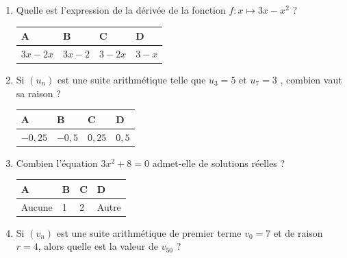 \documentclass[oneside,12pt]{exam}          %
\begin{document}
\begin{enumerate}[label=\underline{Question \no\arabic*} :  , leftmargin=* , itemsep=4mm]
	\item Quelle est l'expression de la dérivée de la fonction $f : x \mapsto 3x - x^2$ \; ?
	
		\hspace{\linewidth-\textwidth}
		\renewcommand{\arraystretch}{1.5}
		\begin{tabular}{| P{0.22\textwidth} | P{0.22\textwidth} | P{0.22\textwidth} | P{0.22\textwidth} |} \hline
			A & B & C & D \\ \hline
			$3x - 2x$ & $3x - 2$ & $3 - 2x$ & $3 - x$ \\ \hline
		\end{tabular}



	\item Si $(u_n)$ est une suite arithmétique telle que $u_3 = 5$ et $u_7 = 3$ , combien vaut sa raison ?
	
		\hspace{\linewidth-\textwidth}
		\renewcommand{\arraystretch}{1.5}
		\begin{tabular}{| P{0.22\textwidth} | P{0.22\textwidth} | P{0.22\textwidth} | P{0.22\textwidth} |} \hline
			A & B & C & D \\ \hline
			$-0,25$ & $-0,5$ & $0,25$ & $0,5$ \\ \hline
		\end{tabular}
		
		

	\item Combien l'équation $3x^2 + 8 = 0$ admet-elle de solutions réelles ?
	
		\hspace{\linewidth-\textwidth}
		\renewcommand{\arraystretch}{1.5}
		\begin{tabular}{| P{0.22\textwidth} | P{0.22\textwidth} | P{0.22\textwidth} | P{0.22\textwidth} |} \hline
			A & B & C & D \\ \hline
			Aucune & 1 & 2 & Autre \\ \hline
		\end{tabular}
		
		

	\item Si $(v_n)$ est une suite arithmétique de premier terme $v_0 = 7$ et de raison $r = 4$, alors quelle est la valeur de $v_{50}$ ?
	

\end{enumerate}
\end{document}

